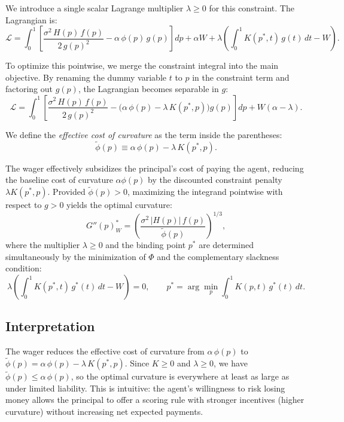 \documentclass[11pt]{article}
\begin{document}
We introduce a single scalar Lagrange multiplier $\lambda \geq 0$ for this constraint. The Lagrangian is:
\begin{equation}\label{eq:lagrangian}
	\mathcal{L} = \int_0^1 \left[\frac{\sigma^2\,H(p)\,f(p)}{2\,g(p)^2} - \alpha\,\phi(p)\,g(p)\right]dp + \alpha W + \lambda \left(\int_0^1 K(p^*,t)\,g(t)\,dt - W\right).
\end{equation}

To optimize this pointwise, we merge the constraint integral into the main objective. By renaming the dummy variable $t$ to $p$ in the constraint term and factoring out $g(p)$, the Lagrangian becomes separable in $g$:
\[
\mathcal{L} = \int_0^1 \left[\frac{\sigma^2\,H(p)\,f(p)}{2\,g(p)^2} - \Big(\alpha\,\phi(p) - \lambda\,K(p^*,p)\Big)g(p)\right]dp + W(\alpha - \lambda).
\]

We define the \emph{effective cost of curvature} as the term inside the parentheses:
\begin{equation}\label{eq:phi-tilde}
	\tilde{\phi}(p) \equiv \alpha\,\phi(p) - \lambda\,K(p^*,p).
\end{equation}

The wager effectively subsidizes the principal's cost of paying the agent, reducing the baseline cost of curvature $\alpha\phi(p)$ by the discounted constraint penalty $\lambda K(p^*,p)$. Provided $\tilde{\phi}(p) > 0$, maximizing the integrand pointwise with respect to $g > 0$ yields the optimal curvature:
\begin{equation}\label{eq:optimal-curvature-wager}
	\boxed{G''(p)^*_W = \left(\frac{\sigma^2\,|H(p)|\,f(p)}{\tilde{\phi}(p)}\right)^{1/3},}
\end{equation}
where the multiplier $\lambda \geq 0$ and the binding point $p^*$ are determined simultaneously by the minimization of $\Phi$ and the complementary slackness condition:
\begin{equation}\label{eq:comp-slack}
	\lambda\left(\int_0^1 K(p^*,t)\,g^*(t)\,dt - W\right) = 0, \qquad p^* = \arg\min_p \int_0^1 K(p,t)\,g^*(t)\,dt.
\end{equation}

\subsection{Interpretation}

The wager reduces the effective cost of curvature from $\alpha\,\phi(p)$ to $\tilde{\phi}(p) = \alpha\,\phi(p) - \lambda\,K(p^*,p)$. Since $K \geq 0$ and $\lambda \geq 0$, we have $\tilde{\phi}(p) \leq \alpha\,\phi(p)$, so the optimal curvature is everywhere at least as large as under limited liability. This is intuitive: the agent's willingness to risk losing money allows the principal to offer a scoring rule with stronger incentives (higher curvature) without increasing net expected payments.
\end{document}
